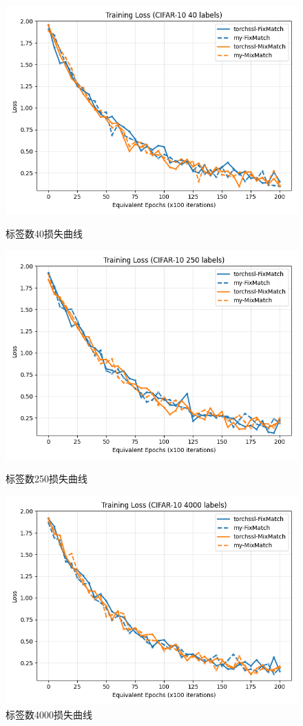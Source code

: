 \documentclass[a4paper, utf8]{ctexart}
\begin{document}
\begin{figure}[htbp]
		\begin{minipage}{.32\textwidth}
			\centering
			\includegraphics[width=.9\textwidth]{./figure/40loss.png}
			\caption{标签数40损失曲线}
		\end{minipage}
		\begin{minipage}{.32\textwidth}
			\centering
			\includegraphics[width=.9\textwidth]{./figure/250loss.png}
			\caption{标签数250损失曲线}
		\end{minipage}
		\begin{minipage}{.32\textwidth}
			\centering
			\includegraphics[width=.9\textwidth]{./figure/4000loss.png}
			\caption{标签数4000损失曲线}
		\end{minipage}
	\end{figure}
	
\end{document}
